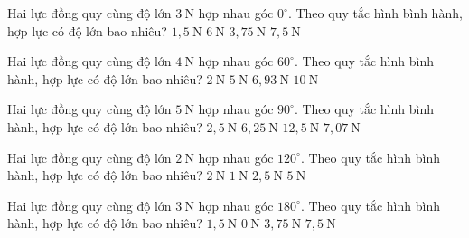 \begin{ex}
Hai lực đồng quy cùng độ lớn $3\ \mathrm{N}$ hợp nhau góc $0^\circ$. Theo quy tắc hình bình hành, hợp lực có độ lớn bao nhiêu?
\choice
{$1,5\ \mathrm{N}$}
{\True $6\ \mathrm{N}$}
{$3,75\ \mathrm{N}$}
{$7,5\ \mathrm{N}$}
\end{ex}

\begin{ex}
Hai lực đồng quy cùng độ lớn $4\ \mathrm{N}$ hợp nhau góc $60^\circ$. Theo quy tắc hình bình hành, hợp lực có độ lớn bao nhiêu?
\choice
{$2\ \mathrm{N}$}
{$5\ \mathrm{N}$}
{\True $6,93\ \mathrm{N}$}
{$10\ \mathrm{N}$}
\end{ex}

\begin{ex}
Hai lực đồng quy cùng độ lớn $5\ \mathrm{N}$ hợp nhau góc $90^\circ$. Theo quy tắc hình bình hành, hợp lực có độ lớn bao nhiêu?
\choice
{$2,5\ \mathrm{N}$}
{$6,25\ \mathrm{N}$}
{$12,5\ \mathrm{N}$}
{\True $7,07\ \mathrm{N}$}
\end{ex}

\begin{ex}
Hai lực đồng quy cùng độ lớn $2\ \mathrm{N}$ hợp nhau góc $120^\circ$. Theo quy tắc hình bình hành, hợp lực có độ lớn bao nhiêu?
\choice
{\True $2\ \mathrm{N}$}
{$1\ \mathrm{N}$}
{$2,5\ \mathrm{N}$}
{$5\ \mathrm{N}$}
\end{ex}

\begin{ex}
Hai lực đồng quy cùng độ lớn $3\ \mathrm{N}$ hợp nhau góc $180^\circ$. Theo quy tắc hình bình hành, hợp lực có độ lớn bao nhiêu?
\choice
{$1,5\ \mathrm{N}$}
{\True $0\ \mathrm{N}$}
{$3,75\ \mathrm{N}$}
{$7,5\ \mathrm{N}$}
\end{ex}

